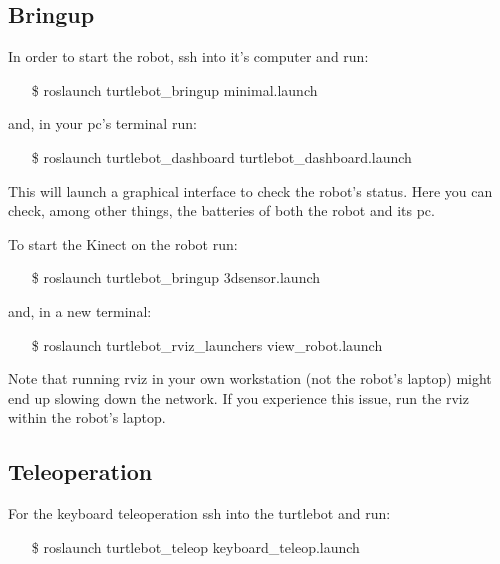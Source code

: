 \documentclass[a4paper,10pt]{article}
\begin{document}
\subsection{Bringup}
In order to start the robot, ssh into it's computer and run:
\begin{shaded}
	\begin{itemize}
		\item[\$] roslaunch turtlebot\_bringup minimal.launch
	\end{itemize}
\end{shaded}
and, in your pc's terminal run:
\begin{shaded}
	\begin{itemize}
		\item[\$] roslaunch turtlebot\_dashboard turtlebot\_dashboard.launch
	\end{itemize}
\end{shaded}
This will launch a graphical interface to check the robot's status. Here you can check, among other things, the batteries of both the robot and its pc.

To start the Kinect on the robot run:
\begin{shaded}
	\begin{itemize}
		\item[\$] roslaunch turtlebot\_bringup 3dsensor.launch
	\end{itemize}
\end{shaded}
and, in a new terminal:
\begin{shaded}
	\begin{itemize}
		\item[\$] roslaunch turtlebot\_rviz\_launchers view\_robot.launch
	\end{itemize}
\end{shaded}
Note that running rviz in your own workstation (not the robot's laptop) might end up slowing down the network. If you experience this issue, run the rviz within the robot's laptop.

\subsection{Teleoperation}
For the keyboard teleoperation ssh into the turtlebot and run:
\begin{shaded}
	\begin{itemize}
		\item[\$] roslaunch turtlebot\_teleop keyboard\_teleop.launch
	\end{itemize}
\end{shaded}
\end{document}
